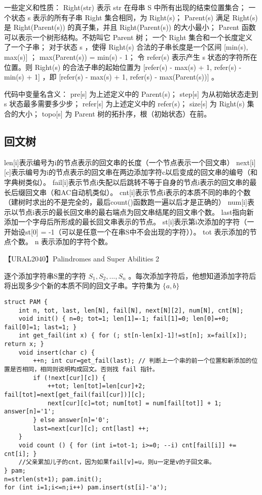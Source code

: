 \documentclass[landscape,a4paper]{article}
\begin{document}
一些定义和性质：
 Right(str) 表示 str 在母串 S 中所有出现的结束位置集合；
 一个状态 s 表示的所有子串 Right 集合相同，为 Right(s)；
 Parent(s) 满足 Right(s) 是 Right(Parent(s)) 的真子集，并且 Right(Parent(s)) 的大小最小；
 Parent 函数可以表示一个树形结构。不妨叫它 Parent 树；
 一个 Right 集合和一个长度定义了一个子串；
 对于状态 s ，使得 Right(s) 合法的子串长度是一个区间 [min(s), max(s)] ；
 max(Parent(s)) = min(s) - 1；
 令 refer(s) 表示产生 s 状态的字符所在位置。则 Right(s) 的合法子串的起始位置为 [refer(s) - max(s) + 1, refer(s) - min(s) + 1] ，即 [refer(s) - max(s) + 1, refer(s) - max(Parent(s))] 。

代码中变量名含义：
 pre[s] 为上述定义中的 Parent(s)；
 step[s] 为从初始状态走到 s 状态最多需要多少步；
 refer[s] 为上述定义中的 refer(s)；
 size[s] 为 Right(s) 集合的大小；
 topo[s] 为 Parent 树的拓扑序，根（初始状态）在前。

\subsection{回文树}

 len[i]表示编号为i的节点表示的回文串的长度（一个节点表示一个回文串）
 next[i][c]表示编号为i的节点表示的回文串在两边添加字符c以后变成的回文串的编号（和字典树类似）。
 fail[i]表示节点i失配以后跳转不等于自身的节点i表示的回文串的最长后缀回文串（和AC自动机类似）。
 cnt[i]表示节点i表示的本质不同的串的个数（建树时求出的不是完全的，最后count()函数跑一遍以后才是正确的）
 num[i]表示以节点i表示的最长回文串的最右端点为回文串结尾的回文串个数。
 last指向新添加一个字母后所形成的最长回文串表示的节点。
 st[i]表示第i次添加的字符（一开始设st[0] = -1（可以是任意一个在串S中不会出现的字符））。
 tot 表示添加的节点个数。
 n 表示添加的字符个数。

【URAL2040】Palindromes and Super Abilities 2

逐个添加字符串S里的字符 $S_1, S_2, ..., S_n$ 。每次添加字符后，他想知道添加字符后将出现多少个新的本质不同的回文子串。字符集为 $\{a, b\}$

\begin{lstlisting}
struct PAM {
	int n, tot, last, len[N], fail[N], next[N][2], num[N], cnt[N];
	void init() { n=0; tot=1; len[1]=-1; fail[1]=0; len[0]=+0; fail[0]=1; last=1; }
	int get_fail(int x) { for (; st[n-len[x]-1]!=st[n]; x=fail[x]); return x; }
	void insert(char c) {
		++n; int cur=get_fail(last); // 判断上一个串的前一个位置和新添加的位置是否相同，相同则说明构成回文。否则找 fail 指针。
		if (!next[cur][c]) {
			++tot; len[tot]=len[cur]+2; fail[tot]=next[get_fail(fail[cur])][c];
			next[cur][c]=tot; num[tot] = num[fail[tot]] + 1; answer[n]='1';
		} else answer[n]='0';
		last=next[cur][c]; cnt[last] ++;
	}
	void count () { for (int i=tot-1; i>=0; --i) cnt[fail[i]] += cnt[i]; }
	//父亲累加儿子的cnt，因为如果fail[v]=u，则u一定是v的子回文串。
} pam;
n=strlen(st+1); pam.init();
for (int i=1;i<=n;i++) pam.insert(st[i]-'a');
\end{lstlisting}
\end{document}

